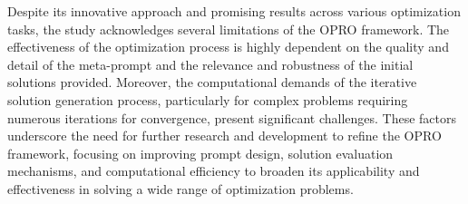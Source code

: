         Despite its innovative approach and promising results across various optimization tasks, the study acknowledges several limitations of the OPRO framework. The effectiveness of the optimization process is highly dependent on the quality and detail of the meta-prompt and the relevance and robustness of the initial solutions provided. Moreover, the computational demands of the iterative solution generation process, particularly for complex problems requiring numerous iterations for convergence, present significant challenges. These factors underscore the need for further research and development to refine the OPRO framework, focusing on improving prompt design, solution evaluation mechanisms, and computational efficiency to broaden its applicability and effectiveness in solving a wide range of optimization problems.
        


